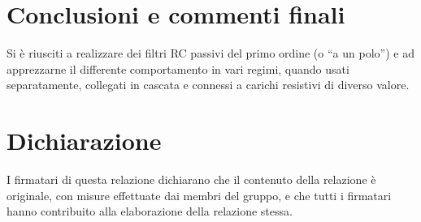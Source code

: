 \documentclass[10pt, a4paper, italian]{article}
\begin{document}
\section*{Conclusioni e commenti finali}
Si è riusciti a realizzare dei filtri RC passivi del primo ordine
(o ``a un polo'') e ad apprezzarne il differente comportamento in vari
regimi, quando usati separatamente, collegati in cascata e connessi a
carichi resistivi di diverso valore.

\section*{Dichiarazione}
I firmatari di questa relazione dichiarano che il contenuto della relazione \`e 
originale, con misure effettuate dai membri del gruppo, e che tutti i firmatari 
hanno contribuito alla elaborazione della relazione stessa.
\end{document}
